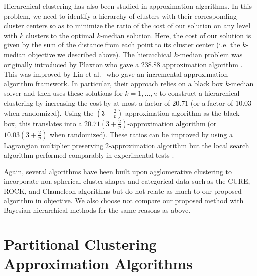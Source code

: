 \documentclass{article}
\begin{document}
Hierarchical clustering has also been studied in approximation algorithms. In this problem, we need to identify a hierarchy of clusters with their corresponding cluster centers so as to minimize the ratio of the cost of our solution on any level with $k$ clusters to the optimal $k$-median solution. Here, the cost of our solution is given by the sum of the distance from each point to its cluster center (i.e. the $k$-median objective we described above). The hierarchical $k$-median problem was originally introduced by Plaxton who gave a 238.88 approximation algorithm \cite{Plaxton}. This was improved by Lin et al.~\cite{Lin} who gave an incremental approximation algorithm framework. In particular, their approach relies on a black box $k$-median solver and then uses these solutions for $k=1, \ldots, n$ to construct a hierarchical clustering by increasing the cost by at most a factor of $20.71$ (or a factor of $10.03$ when randomized). Using the $(3+\frac{2}{p})$-approximation algorithm as the black-box, this translates into a $20.71 (3+\frac{2}{p})$-approximation algorithm (or $10.03 (3+\frac{2}{p})$ when randomized). These ratios can be improved by using a Lagrangian multiplier preserving $2$-approximation algorithm but the local search algorithm performed comparably in experimental tests \cite{Nagarajan}.

Again, several algorithms have been built upon agglomerative clustering to incorporate non-spherical cluster shapes and categorical data such as the CURE, ROCK, and Chameleon algorithms \cite{Guha_CURE, Guha_ROCK, Karypis} but do not relate as much to our proposed algorithm in objective. We also choose not compare our proposed method with Bayesian hierarchical methods for the same reasons as above. 

\section{Partitional Clustering Approximation Algorithms}
\end{document}
